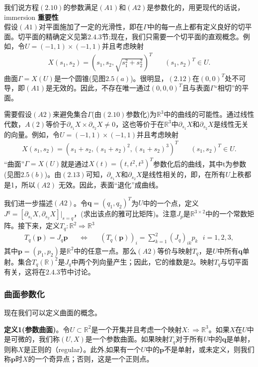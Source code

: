 我们说方程$(2.10)$的参数满足$(A1)$和$(A2)$是参数化的，用更现代的话说，immersion
\textbf{重要性}\\
假设$(A1)$对平面施加了一定的光滑性，即在$\Gamma$中的每一点上都有定义良好的切平面。切平面的精确定义见第$2.4.3$节;现在，我们只需要一个切平面的直观概念。例如，令$U=(-1,1)\times (-1,1)$并且考虑映射
\begin{gather}
X(s_1,s_2)=(s_1,s_2,\sqrt{s_1^2+s_2^2})^T~~~~~~~~(s_1,s_2)^T\in U.
\end{gather}
曲面$\Gamma = X(U)$是一个圆锥(见图$2.5(a)$)。很明显，$(2.12)$在$(0,0)^T$处不可导，即$(A1)$是无效的。因此，不存在唯一通过$(0,0,0)^T$且与表面$\Gamma$“相切”的平面。

需要假设$(A2)$来避免集合$\Gamma$(由$(2.10)$参数化)为$\mathbb{R}^3$中的曲线的可能性。通过线性代数，$A(2)$等价于$\partial _{s_1}X \times \partial _{s_2}X\neq 0$，这也等价于在$\mathbb{R}^3$中$\partial _{s_1}X$和$\partial _{s_2}X$是线性无关的向量。例如，令$U= (-1,1) \times (-1,1)$并且考虑映射
\begin{gather}
X(s_1,s_2)=(s_1+s_2,(s_1+s_2)^2,(s_1+s_2)^3)^T~~~~~~~~(s_1,s_2)^T\in U.
\end{gather}
“曲面”$\Gamma =X(U)$就是通过$X(t)=(t,t^2,t^3)^T$参数化后的曲线，其中t为参数(见图$2.5(b)$)。由$(2.13)$可知，$\partial _{s_1}X$和$\partial _{s_2}X$是线性相关的，即，在所有$U$上秩都是1，所以$(A2)$ 无效。因此，表面“退化”成曲线。

我们进一步描述$(A2)$。令$\mathbf{q}=(q_1,q_2)^T$为$U$中的一个点，定义$J^{q}=\left[ \partial _{s_1}X,\partial _{s_2}X \right]|_{s=q}$，(求出该点的雅可比矩阵)。注意$J_p$是$\mathbb{R}^{3\times 2}$中的一个常数矩阵。接下来，定义$T_q:\mathbb{R}^2 \Rightarrow \mathbb{R}^3$
\begin{gather}
T_q(\mathbf{p})=J_q \mathbf{p}~~~~~~~\Leftrightarrow~~~~~~~(T_q(\mathbf{p}))_i=\sum_{k=1}^{2}(J_q)_{ik}p_k~~~i=1,2,3,
\end{gather}
其中$\mathbf{p}= (p_1,p_2)$是$\mathbb{R}^2$中的任意一点。那么$(A2)$等价与映射$T_q$，是$U$中所有$\mathbf{q}$单射。集合$T_q(\mathbb{R})^2$是$J_q$中两个列向量产生；因此，它的维数是$2$。映射$T_q$与切平面有关，这将在$2.4.3$节中讨论。

\subsubsection{曲面参数化}
现在我们可以定义曲面的概念。

\textbf{定义1(参数曲面)}。令$U \subset \mathbb{R}^2$是一个开集并且考虑一个映射$X:\Rightarrow \mathbb{R}^3$。如果$X$在$U$中是可微的，我们称$(U,X)$是一个参数曲面。如果映射$T_q$对于所有$U$中的$\mathbf{q}$是单射，则称$X$是正则的（regular）。此外,如果有一个$U$中的$\mathbf{p}$不是单射，或未定义，则我们称$\mathbf{p}$时$X$的一个奇异点；否则，这是一个正则点。\\

